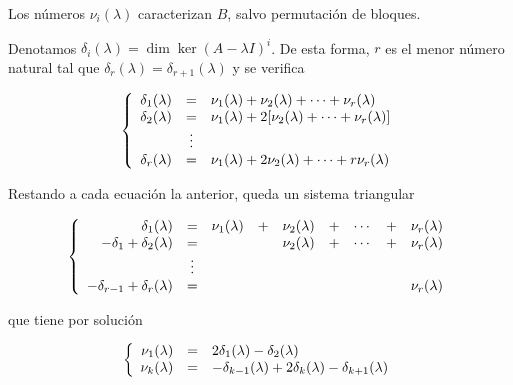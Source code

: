 \documentclass[../ecuaciones_diferenciales.tex]{subfiles}
\begin{document}
\begin{remark}
	Los números \(\nu_i(\lambda)\) caracterizan \(B\), salvo permutación de bloques.
\end{remark}

Denotamos \(\delta_i(\lambda) = \dim \ker (A - \lambda I)^i\). De esta forma,
\(r\) es el menor número natural tal que \(\delta_r(\lambda) =
\delta_{r+1}(\lambda)\) y se verifica

\[\left\{
	\begin{array}[ht]{r c l}
		\delta_1(\lambda) & =      & \nu_1(\lambda) + \nu_2(\lambda) + \cdots +
		\nu_r(\lambda)                                                                           \\
		\delta_2(\lambda) & =      & \nu_1(\lambda) + 2[\nu_2(\lambda) + \cdots +
		\nu_r(\lambda)]                                                                          \\
		                  & \vdots &                                                             \\
		\delta_r(\lambda) & =      & \nu_1(\lambda) + 2\nu_2(\lambda) + \cdots + r\nu_r(\lambda)
	\end{array}
	\right.
\]

Restando a cada ecuación la anterior, queda un sistema triangular

\[\left\{
	\begin{array}[ht]{r c c c c c c c c}
		\delta_1(\lambda)                 & =      & \nu_1(\lambda) & + & \nu_2(\lambda) & + & \cdots & + & \nu_r(\lambda) \\
		-\delta_1 + \delta_2(\lambda)     & =      &                &   & \nu_2(\lambda) & + & \cdots & + & \nu_r(\lambda) \\
		                                  & \vdots &                                                                       \\
		-\delta_{r-1} + \delta_r(\lambda) & =      &                &   &                &   &        &   & \nu_r(\lambda)
	\end{array}
	\right.
\]

que tiene por solución

\[\left\{
	\begin{array}[ht]{r c l}
		\nu_1(\lambda) & = & 2\delta_1(\lambda) - \delta_2(\lambda)                              \\
		\nu_k(\lambda) & = & -\delta_{k-1}(\lambda) + 2\delta_k(\lambda) - \delta_{k+1}(\lambda)
	\end{array}
	\right.
\]
\end{document}
